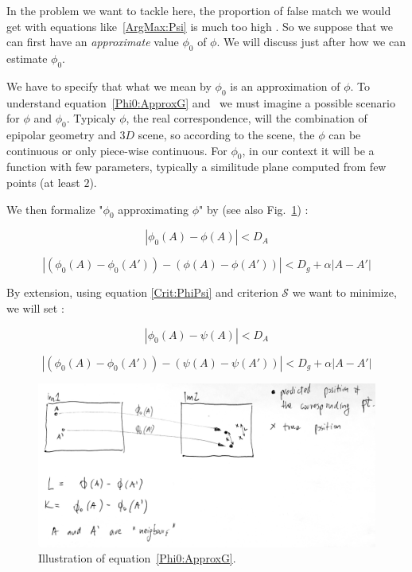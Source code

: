 In the problem we want to tackle here, the proportion of false match we would get with
equations like~\ref{ArgMax:Psi} is much too high . So we suppose that we can first
have an \emph{approximate} value $\phi_0$ of $\phi$. We will discuss just after how we can
estimate $\phi_0$.

We have to specify that what we mean by $\phi_0$ is an approximation of $\phi$.
To understand equation~\ref{Phi0:ApproxG}  and~\label{Phi0:Appro} we must
imagine a possible scenario for $\phi$ and $\phi_0$. Typicaly $\phi$, the real
correspondence, will the combination of epipolar geometry and $3D$ scene, so according
to the scene, the $\phi$ can be  continuous or only piece-wise continuous. For $\phi_0$,
in our context it will be a function with few parameters, typically a similitude
plane computed from few points (at least $2$). 

We then formalize "$\phi_0$ approximating  $\phi$" by (see also Fig.~\ref{fig:spatial-consist}) :


\begin{equation}
     | \phi_0(A)  - \phi(A) |  < D_A  \label{Phi0:Appro}
\end{equation}

\begin{equation}
     | (\phi_0(A) - \phi_0(A')) -(\phi(A) - \phi(A')) |  < D_g +  \alpha |A-A'|  \label{Phi0:ApproxG}
\end{equation}

By extension, using equation \ref{Crit:PhiPsi} and criterion $\mathcal S$ we want to minimize,
we will set :

\begin{equation}
     | \phi_0(A)  - \psi(A) |  < D_A  \label{PsiPhi0:Appro}
\end{equation}

\begin{equation}
     | (\phi_0(A) - \phi_0(A')) -(\psi(A) - \psi(A')) |  < D_g +  \alpha |A-A'|  \label{PsiPhi0:ApproxG}
\end{equation}

\begin{figure}
\centering
\includegraphics[width=12cm]{Methods/spatial_consist.JPG}\caption{Illustration of equation~\ref{Phi0:ApproxG}.}\label{fig:spatial-consist}
\end{figure}

